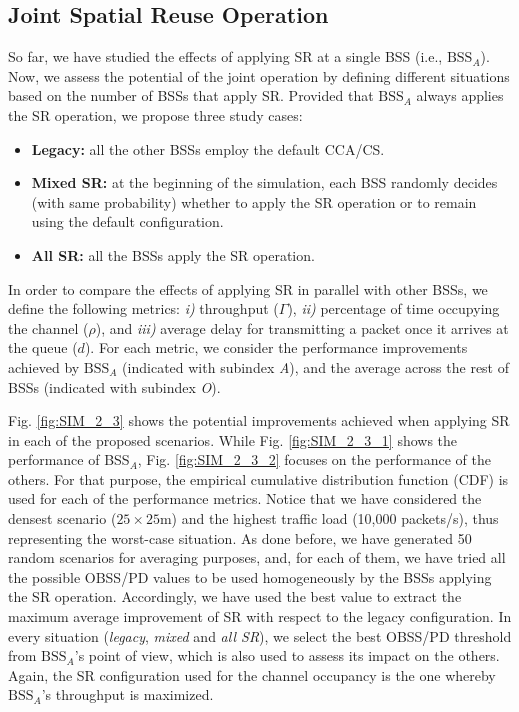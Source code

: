 \documentclass{ieeeaccess}
\begin{document}
\subsection{Joint Spatial Reuse Operation}
\label{section:random_scenarios_collaborative}
So far, we have studied the effects of applying SR at a single BSS (i.e., $\text{BSS}_A$). Now, we assess the potential of the joint operation by defining different situations based on the number of BSSs that apply SR. Provided that $\text{BSS}_A$ always applies the SR operation, we propose three study cases: 
\begin{itemize}
	\item \textbf{Legacy:} all the other BSSs employ the default CCA/CS.
	\item \textbf{Mixed SR:} at the beginning of the simulation, each BSS randomly decides (with same probability) whether to apply the SR operation or to remain using the default configuration.
	\item \textbf{All SR:} all the BSSs apply the SR operation. 
\end{itemize}

In order to compare the effects of applying SR in parallel with other BSSs, we define the following metrics: \emph{i)} throughput ($\Gamma$), \emph{ii)} percentage of time occupying the channel ($\rho$), and \emph{iii)} average delay for transmitting a packet once it arrives at the queue ($d$). For each metric, we consider the performance improvements achieved by $\text{BSS}_A$ (indicated with subindex \emph{A}), and the average across the rest of BSSs (indicated with subindex \emph{O}).

Fig. \ref{fig:SIM_2_3} shows the potential improvements achieved when applying SR in each of the proposed scenarios. While Fig. \ref{fig:SIM_2_3_1} shows the performance of BSS$_A$, Fig. \ref{fig:SIM_2_3_2} focuses on the performance of the others. For that purpose, the empirical cumulative distribution function (CDF) is used for each of the performance metrics. Notice that we have considered the densest scenario ($25\times25$m) and the highest traffic load (10,000 packets/s), thus representing the worst-case situation. As done before, we have generated 50 random scenarios for averaging purposes, and, for each of them, we have tried all the possible OBSS/PD values to be used homogeneously by the BSSs applying the SR operation. Accordingly, we have used the best value to extract the maximum average improvement of SR with respect to the legacy configuration. In every situation (\emph{legacy}, \emph{mixed} and \emph{all SR}), we select the best OBSS/PD threshold from $\text{BSS}_A$'s point of view, which is also used to assess its impact on the others. Again, the SR configuration used for the channel occupancy is the one whereby $\text{BSS}_A$'s throughput is maximized.
\end{document}
